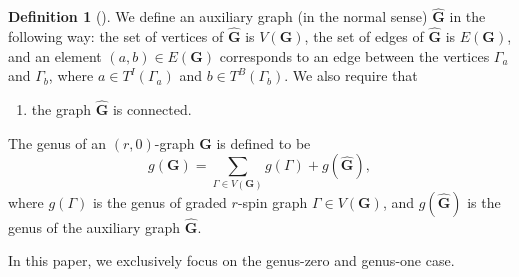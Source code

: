 \documentclass[11pt]{amsart}
\theoremstyle{definition}
\newtheorem{dfn}[dummy]{Definition}
\theoremstyle{remark}
\newcommand{\<}{\left<}
\renewcommand{\>}{\right>}
\numberwithin{equation}{section}
\begin{document}
\begin{dfn}[{\cite[Definition 4.7]{TZ1}}]
    We %
define an auxiliary graph (in the normal sense) $\hat{\mathbf{G}}$ in the following way: the set of vertices of $\hat{\mathbf{G}}$ is $V(\mathbf{G})$, the set of edges of $\hat{\mathbf{G}}$ %
is $E(\mathbf{G})$, and an %
element $(a,b)\in E(\mathbf{G})$ corresponds  to an edge between the vertices $\Gamma_a$ and $\Gamma_b$, where  $a\in T^I(\Gamma_a)$ and $b\in T^B(\Gamma_b)$. We also require that
\begin{enumerate}[resume*]
    \item  the graph $\hat{\mathbf{G}}$ is connected.
\end{enumerate}

The genus of an $(r,0)$-graph $\mathbf{G}$ is defined to be 
$$
g(\mathbf{G})=\sum_{\Gamma\in V(\bm{G})}g(\Gamma)+g(\hat{\mathbf{G}}),
$$
where $g(\Gamma)$ is the genus of graded $r$-spin graph $\Gamma\in V(\bm{G})$, and $g(\hat{\mathbf{G}})$ is the genus of the auxiliary graph $\hat{\mathbf{G}}$.

\end{dfn}

In this paper, we exclusively focus on the genus-zero and genus-one case.
\end{document}
